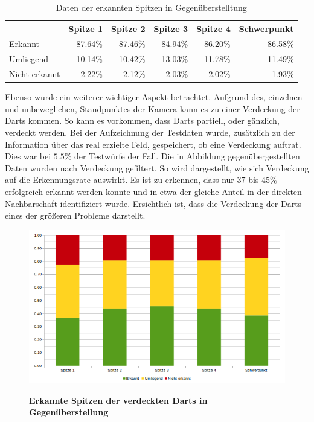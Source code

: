 \begin{table}[htbp]
\caption{Daten der erkannten Spitzen in Gegenüberstelltung}
\begin{tabular}{|l|r|r|r|r|r|}
\hline
 & \multicolumn{1}{l|}{Spitze 1} & \multicolumn{1}{l|}{Spitze 2} & \multicolumn{1}{l|}{Spitze 3} & \multicolumn{1}{l|}{Spitze 4} & \multicolumn{1}{l|}{Schwerpunkt} \\ \hline
Erkannt & 87.64\% & 87.46\% & 84.94\% & 86.20\% & 86.58\% \\ \hline
Umliegend & 10.14\% & 10.42\% & 13.03\% & 11.78\% & 11.49\% \\ \hline
Nicht erkannt & 2.22\% & 2.12\% & 2.03\% & 2.02\% & 1.93\% \\ \hline
\end{tabular}
\label{Tab:plaindata}
\end{table}

Ebenso wurde ein weiterer wichtiger Aspekt betrachtet. Aufgrund des, einzelnen und unbeweglichen, Standpunktes der Kamera kann es zu einer Verdeckung der Darts kommen. So kann es vorkommen, dass Darts partiell, oder gänzlich, verdeckt werden. Bei der Aufzeichnung der Testdaten wurde, zusätzlich zu der Information über das real erzielte Feld, gespeichert, ob eine Verdeckung auftrat. Dies war bei $5.5\%$ der Testwürfe der Fall.
Die in Abbildung  gegenübergestellten Daten wurden nach Verdeckung gefiltert. So wird dargestellt, wie sich Verdeckung auf die Erkennungsrate auswirkt. Es ist zu erkennen, dass nur $37$ bis $45\%$ erfolgreich erkannt werden konnte und in etwa der gleiche Anteil in der direkten Nachbarschaft identifiziert wurde. 
Ersichtlich ist, dass die Verdeckung der Darts eines der größeren Probleme darstellt.

\begin{figure}[ht]
\centering
\includegraphics[width=\textwidth]{media/chartonlycovert}\\
\caption{\textbf{Erkannte Spitzen der verdeckten Darts in Gegenüberstellung}}
\label{Fig:chartcovert}
\end{figure}

